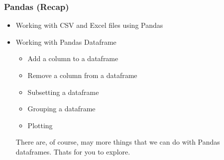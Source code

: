 
\begin{frame}[fragile]\frametitle{ Pandas (Recap)}
\begin{itemize}
\item Working with CSV and Excel files using Pandas
\item Working with Pandas Dataframe
\begin{itemize}
\item Add a column to a dataframe
\item Remove a column from a dataframe
\item Subsetting a dataframe
\item Grouping a dataframe
\item Plotting
\end{itemize}
There are, of course, may more things that we can do with Pandas dataframes. Thats for you to explore.
\end{itemize}
\end{frame}
